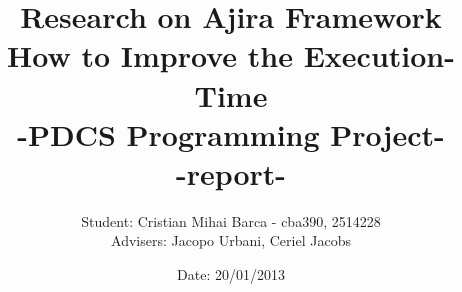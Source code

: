 \begin{titlepage}
\title{Research on Ajira Framework \\ How to Improve the Execution-Time \\ -PDCS Programming Project-  \\ -report- \\}
\author{Student: Cristian Mihai Barca - cba390, 2514228 \\ Advisers: Jacopo Urbani, Ceriel Jacobs}
\date{Date: 20/01/2013}
\maketitle
\end{titlepage}

